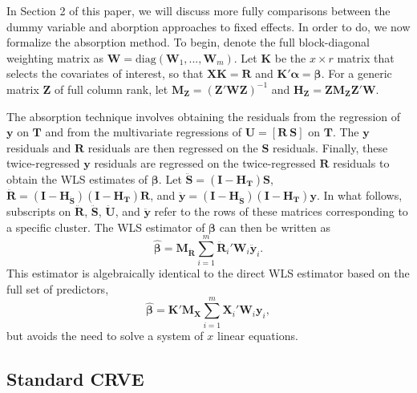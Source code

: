 \documentclass[12pt]{article}\usepackage[]{graphicx}\usepackage[]{color}
\newcommand{\bm}{\mathbf}
\newcommand{\bs}{\boldsymbol}
\begin{document}
In Section 2 of this paper, we will discuss more fully comparisons between the dummy variable and aborption approaches to fixed effects. 
In order to do, we now formalize the absorption method.
To begin, denote the full block-diagonal weighting matrix as $\bm{W} = \text{diag}\left(\bm{W}_1,...,\bm{W}_m\right)$.
Let $\bm{K}$ be the $x \times r$ matrix that selects the covariates of interest, so that $\bm{X} \bm{K} = \bm{R}$ and $\bm{K}'\bs\alpha = \bs\beta$.
For a generic matrix $\bm{Z}$ of full column rank, let $\bm{M_Z} = \left(\bm{Z}'\bm{W}\bm{Z}\right)^{-1}$ and $\bm{H_Z} = \bm{Z}\bm{M_Z}\bm{Z}'\bm{W}$. 

The absorption technique involves obtaining the residuals from the regression of $\bm{y}$ on $\bm{T}$ and from the multivariate regressions of $\bm{U} = [\bm{R}\ \bm{S}]$ on $\bm{T}$. 
The $\bm{y}$ residuals and $\bm{R}$ residuals are then regressed on the $\bm{S}$ residuals. 
Finally, these twice-regressed $\bm{y}$ residuals are regressed on the twice-regressed $\bm{R}$ residuals to obtain the WLS estimates of $\bs\beta$. 
Let $\bm{\ddot{S}} = \left(\bm{I} - \bm{H_T}\right)\bm{S}$, $\bm{\ddot{R}} = \left(\bm{I} - \bm{H_{\ddot{S}}}\right)\left(\bm{I} - \bm{H_T}\right)\bm{R}$, and $\bm{\ddot{y}} = \left(\bm{I} - \bm{H_{\ddot{S}}}\right)\left(\bm{I} - \bm{H_T}\right)\bm{y}$. 
In what follows, subscripts on $\bm{\ddot{R}}$, $\bm{\ddot{S}}$,  $\bm{\ddot{U}}$, and $\bm{\ddot{y}}$ refer to the rows of these matrices corresponding to a specific cluster. 
The WLS estimator of $\bs\beta$ can then be written as
\begin{equation}
\label{eq:WLS}
\bs{\hat\beta} = \bm{M_{\ddot{R}}} \sum_{i=1}^m \bm{\ddot{R}}_i' \bm{W}_i \bm{\ddot{y}}_i. 
\end{equation}
This estimator is algebraically identical to the direct WLS estimator based on the full set of predictors, \[
\bs{\hat\beta} = \bm{K}'\bm{M_X} \sum_{i=1}^m \bm{X}_i' \bm{W}_i \bm{y}_i,
\]
but avoids the need to solve a system of $x$ linear equations.

\subsection{Standard CRVE}

\end{document}

